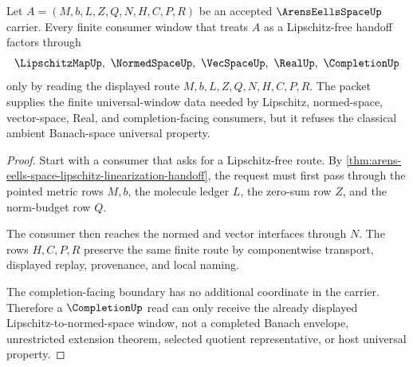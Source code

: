 \begin{theorem}
\label{thm:arens-eells-lipschitz-free-universal-window}
Let $A=(M,b,L,Z,Q,N,H,C,P,R)$ be an accepted $\ArensEellsSpaceUp$ carrier. Every finite consumer window that treats $A$ as a Lipschitz-free handoff factors through
$$
\LipschitzMapUp,\ \NormedSpaceUp,\ \VecSpaceUp,\ \RealUp,\ \CompletionUp
$$
only by reading the displayed route $M,b,L,Z,Q,N,H,C,P,R$. The packet supplies the finite universal-window data needed by Lipschitz, normed-space, vector-space, Real, and completion-facing consumers, but it refuses the classical ambient Banach-space universal property.
\end{theorem}
\begin{proof}
Start with a consumer that asks for a Lipschitz-free route. By \autoref{thm:arens-eells-space-lipschitz-linearization-handoff}, the request must first pass through the pointed metric rows $M,b$, the molecule ledger $L$, the zero-sum row $Z$, and the norm-budget row $Q$.

The consumer then reaches the normed and vector interfaces through $N$. The rows $H,C,P,R$ preserve the same finite route by componentwise transport, displayed replay, provenance, and local naming.

The completion-facing boundary has no additional coordinate in the carrier. Therefore a $\CompletionUp$ read can only receive the already displayed Lipschitz-to-normed-space window, not a completed Banach envelope, unrestricted extension theorem, selected quotient representative, or host universal property.
\end{proof}




